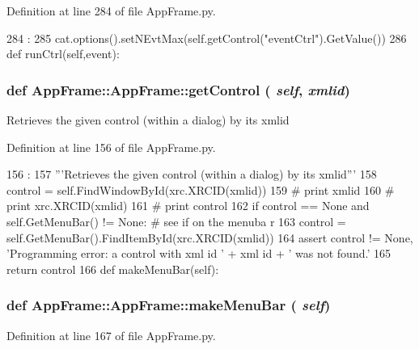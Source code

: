 Definition at line 284 of file AppFrame.py.


\begin{DoxyCode}
284                              :
285         cat.options().setNEvtMax(self.getControl("eventCtrl").GetValue()) 
286 
    def runCtrl(self,event):
\end{DoxyCode}
\hypertarget{classAppFrame_1_1AppFrame_a339ae421d03a4184269c6b7e3537ab08}{
\subsubsection[{getControl}]{\setlength{\rightskip}{0pt plus 5cm}def AppFrame::AppFrame::getControl ( {\em self}, \/   {\em xmlid})}}
\label{classAppFrame_1_1AppFrame_a339ae421d03a4184269c6b7e3537ab08}
\begin{DoxyVerb}Retrieves the given control (within a dialog) by its xmlid\end{DoxyVerb}
 

Definition at line 156 of file AppFrame.py.


\begin{DoxyCode}
156                                :
157         '''Retrieves the given control (within a dialog) by its xmlid'''
158         control = self.FindWindowById(xrc.XRCID(xmlid))
159 #        print xmlid
160 #        print xrc.XRCID(xmlid)
161 #        print control
162         if control == None and self.GetMenuBar() != None:  # see if on the menuba
      r
163             control = self.GetMenuBar().FindItemById(xrc.XRCID(xmlid))
164         assert control != None, 'Programming error: a control with xml id ' + xml
      id + ' was not found.'
165         return control
166     
    def makeMenuBar(self):
\end{DoxyCode}
\hypertarget{classAppFrame_1_1AppFrame_a71b05a3223d3ab9595beb5a6158a4658}{
\subsubsection[{makeMenuBar}]{\setlength{\rightskip}{0pt plus 5cm}def AppFrame::AppFrame::makeMenuBar ( {\em self})}}
\label{classAppFrame_1_1AppFrame_a71b05a3223d3ab9595beb5a6158a4658}


Definition at line 167 of file AppFrame.py.


